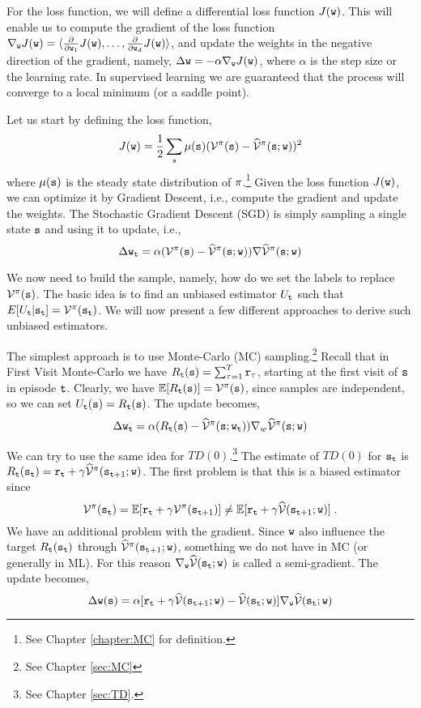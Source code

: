 For the loss function, we will define a differential loss function
$J({\tt w})$. This will enable us to compute the gradient of the
loss function $\nabla_{\tt w}
J({\tt w})=\langle\frac{\partial}{\partial {\tt w}_1}J({\tt w}),
\ldots , \frac{\partial}{\partial {\tt w}_d}J({\tt w})\rangle$, and
update the weights in the negative direction of the gradient,
namely, $\Delta {\tt w}=-\alpha\nabla_{\tt w} J({\tt w})$, where
$\alpha$ is the step size or the learning rate. In supervised
learning we are guaranteed that the process will converge to a local
minimum (or a saddle point).

Let us start by defining the loss function,
\[
J({\tt w})=\frac{1}{2}\sum_s
\mu({\tt s})(\mathcal{V}^\pi({\tt s})-\widehat{\mathcal{V}}^\pi({\tt s};{\tt w}))^2
\]
where $\mu({\tt s})$ is the steady state distribution of
$\pi$.\footnote{See Chapter \ref{chapter:MC} for definition.} Given the loss function $J({\tt w})$, we can optimize it by Gradient Descent, i.e., compute the gradient and update the weights. The Stochastic
Gradient Descent (SGD) is simply sampling a single state ${\tt s}$
and using it to update, i.e.,
\[
\Delta {\tt w}_{\tt t} = \alpha (\mathcal{V}^\pi
({\tt s})-\widehat{\mathcal{V}}^\pi({\tt s};{\tt w}))\nabla
\widehat{\mathcal{V}}^\pi ({\tt s};{\tt w})
\]

We now need to build the sample, namely, how do we set the labels to
replace $\mathcal{V}^\pi ({\tt s})$. The basic idea is to find an
unbiased estimator $U_{\tt t}$ such that $E[U_{\tt t}
|{\tt s}_{\tt t}]=\mathcal{V}^\pi({\tt s}_{\tt t})$. We will now present
a few different approaches to derive such unbiased estimators.

The simplest approach is to use Monte-Carlo (MC)
sampling.\footnote{See Chapter \ref{sec:MC}} Recall that in First
Visit Monte-Carlo we have $R_{\tt t}({\tt s})=\sum_{\tau=1}^T
{\tt r}_\tau$, starting at the first visit of ${\tt s}$ in episode
${\tt t}$. Clearly, we have
$\mathbb{E}[R_{\tt t}({\tt s})]=\mathcal{V}^\pi({\tt s})$, since samples are
independent, so we can set $U_{\tt t}({\tt s})=R_{\tt t}({\tt s})$. The
update becomes,
\[
\Delta {\tt w}_{\tt t} = \alpha
(R_{\tt t}({\tt s})-\widehat{\mathcal{V}}^\pi({\tt s};{\tt w}_{\tt t}))\nabla_{w}
\widehat{\mathcal{V}}^\pi ({\tt s};{\tt w})
\]

We can try to use the same idea for $TD(0)$.\footnote{See Chapter
\ref{sec:TD}.} The estimate of $TD(0)$ for ${\tt s}_{\tt t}$ is
$R_{\tt t}({\tt s}_{\tt t})={\tt r}_{\tt t}+\gamma
\widehat{\mathcal{V}}^\pi({\tt s}_{{\tt t}+1};{\tt w})$. The first problem
is that this is a biased estimator since
\[
\mathcal{V}^\pi({\tt s}_{\tt t})=\mathbb{E}[{\tt r}_{\tt t}+\gamma
\mathcal{V}^\pi({\tt s}_{{\tt t}+1})]\neq \mathbb{E}[{\tt r}_{\tt t}+\gamma
\widehat{\mathcal{V}}({\tt s}_{{\tt t}+1};{\tt w})]\;.
\]
We have an additional problem with the gradient. Since
${\tt w}$ also influence the target $R_{\tt t}({\tt s}_{\tt t})$
through $\widehat{\mathcal{V}}^\pi({\tt s}_{{\tt t}+1};{\tt w})$, something
we do not have in MC (or generally in ML). For this reason
$\nabla_{\tt w} \widehat{\mathcal{V}}({\tt s}_{\tt t};{\tt w})$ is called a
semi-gradient. The update becomes,
\[
\Delta {\tt w} ({\tt s})= \alpha[{\tt r}_{\tt t} +\gamma
\widehat{\mathcal{V}}({\tt s}_{{\tt t}+1};{\tt w})-\widehat{\mathcal{V}}({\tt s}_{\tt t};{\tt w})]\nabla_{\tt w}
\widehat{\mathcal{V}}({\tt s}_{\tt t};{\tt w})
\]

